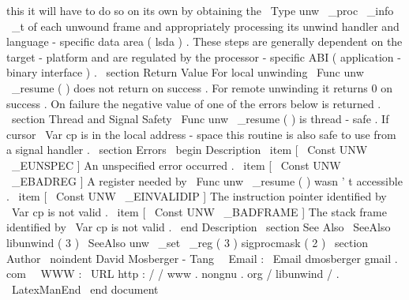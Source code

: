 this
it
will
have
to
do
so
on
its
own
by
obtaining
the
\
Type
{
unw
\
_proc
\
_info
\
_t
}
of
each
unwound
frame
and
appropriately
processing
its
unwind
handler
and
language
-
specific
data
area
(
lsda
)
.
These
steps
are
generally
dependent
on
the
target
-
platform
and
are
regulated
by
the
processor
-
specific
ABI
(
application
-
binary
interface
)
.
\
section
{
Return
Value
}
For
local
unwinding
\
Func
{
unw
\
_resume
}
(
)
does
not
return
on
success
.
For
remote
unwinding
it
returns
0
on
success
.
On
failure
the
negative
value
of
one
of
the
errors
below
is
returned
.
\
section
{
Thread
and
Signal
Safety
}
\
Func
{
unw
\
_resume
}
(
)
is
thread
-
safe
.
If
cursor
\
Var
{
cp
}
is
in
the
local
address
-
space
this
routine
is
also
safe
to
use
from
a
signal
handler
.
\
section
{
Errors
}
\
begin
{
Description
}
\
item
[
\
Const
{
UNW
\
_EUNSPEC
}
]
An
unspecified
error
occurred
.
\
item
[
\
Const
{
UNW
\
_EBADREG
}
]
A
register
needed
by
\
Func
{
unw
\
_resume
}
(
)
wasn
'
t
accessible
.
\
item
[
\
Const
{
UNW
\
_EINVALIDIP
}
]
The
instruction
pointer
identified
by
\
Var
{
cp
}
is
not
valid
.
\
item
[
\
Const
{
UNW
\
_BADFRAME
}
]
The
stack
frame
identified
by
\
Var
{
cp
}
is
not
valid
.
\
end
{
Description
}
\
section
{
See
Also
}
\
SeeAlso
{
libunwind
(
3
)
}
\
SeeAlso
{
unw
\
_set
\
_reg
(
3
)
}
sigprocmask
(
2
)
\
section
{
Author
}
\
noindent
David
Mosberger
-
Tang
\
\
Email
:
\
Email
{
dmosberger
gmail
.
com
}
\
\
WWW
:
\
URL
{
http
:
/
/
www
.
nongnu
.
org
/
libunwind
/
}
.
\
LatexManEnd
\
end
{
document
}
